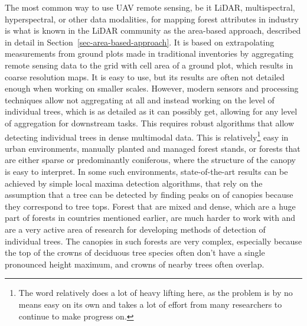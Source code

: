 The most common way to use UAV remote sensing, be it LiDAR, multispectral, hyperspectral, or other data modalities, for mapping forest attributes in industry is what is known in the LiDAR community as the area-based approach, described in detail in Section~\ref{sec-area-based-approach}.
It is based on extrapolating measurements from ground plots made in traditional inventories by aggregating remote sensing data to the grid with cell area of a ground plot, which results in coarse resolution maps.
It is easy to use, but its results are often not detailed enough when working on smaller scales.
However, modern sensors and processing techniques allow not aggregating at all and instead working on the level of individual trees, which is as detailed as it can possibly get, allowing for any level of aggregation for downstream tasks.
This requires robust algorithms that allow detecting individual trees in dense multimodal data.
This is relatively\footnote{The word relatively does a lot of heavy lifting here, as the problem is by no means easy on its own and takes a lot of effort from many researchers to continue to make progress on.
} easy in urban environments, manually planted and managed forest stands, or forests that are either sparse or predominantly coniferous, where the structure of the canopy is easy to interpret.
In some such environments, state-of-the-art results can be achieved by simple local maxima detection algorithms, that rely on the assumption that a tree can be detected by finding peaks on of canopies because they correspond to tree tops.
Forest that are mixed and dense, which are a huge part of forests in countries mentioned earlier, are much harder to work with and are a very active area of research for developing methods of detection of individual trees.
The canopies in such forests are very complex, especially because the top of the crowns of deciduous tree species often don't have a single pronounced height maximum, and crowns of nearby trees often overlap.

